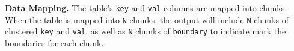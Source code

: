 \begin{comment}
We build the on-GPU clustering kernel by compositing the \texttt{radix\_sort\_pair()} from rocPRIM with our customized \texttt{find\_boundary()} kernel, instead of from scratch.
Given a set of \texttt{<key, val>} tuples from the table, the clustering kernel forms the groups by sorting these tuples based on their hashes and produces another \texttt{boundary} array that marks the boundaries of groups.
We illustrate this process with a simplified example, shown in the lower half of Figure~\ref{fig:radix-parition-flow}.
In this example, we are processing 3-bit unsigned integers and use the lower two bits of the keys as the hashes to cluster them into 4 groups.
The executor loads a partition of 4 tuples from the CPU, and the kernel first uses \texttt{radix\_sort\_pair()} to sort these 4 tuples by the lower two bits (\circled{1}).
The data is now clustered but the boundary is still unknown.
The \texttt{boundary} array generated by \texttt{find\_boundary()} contains $N + 1$ elements when there are $N$ different groups.
The $i$th group's hash is $i$ and contains the tuples in the range of \texttt{[boundary[i], boundary[i+1])}.
In this example, \texttt{boundary} contains 5 elements all initialized with empty tokens \texttt{N}.
It first masks keys with \texttt{0b11} to get their hashes (\circled{2}).
Then, it checks whether each hash equals the hash in front of it in parallel.
The inconsistency detected for a hash $h$ at location $i$ indicates that the $h$th group starts at $i$, and $i$ is written to the $h$th entry of the \texttt{boundary} array (\circled{3}).
In our example, the second element in \texttt{boundary} is still \texttt{N} because the group with a hash 1 is empty.
We complete the \texttt{boundary} array by replacing \texttt{N} with the element next to it, which represents an empty group (\circled{4}).
Now, we have the tuples clustered and a \texttt{boundary} array to locate each group, which then is stored back to the CPU.
\end{comment}


\noindent
\textbf{Data Mapping.}
The table's \texttt{key} and \texttt{val} columns are mapped into chunks.
When the table is mapped into \texttt{N} chunks, the output will include \texttt{N} chunks of clustered \texttt{key} and \texttt{val}, as well as \texttt{N} chunks of \texttt{boundary} to indicate mark the boundaries for each chunk.

